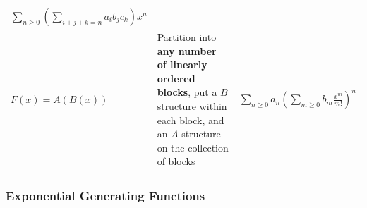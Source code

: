 \begin{longtable}[]{@{}lll@{}}
\begin{minipage}[t]{0.30\columnwidth}
\(\displaystyle\sum_{n\geq 0} \left( \displaystyle\sum_{i+j+k=n} a_i b_j c_k\right) {x^n}\)\strut
\end{minipage}\tabularnewline
\begin{minipage}[t]{0.30\columnwidth}\raggedright
\(F(x) = A(B(x))\)\strut
\end{minipage} & \begin{minipage}[t]{0.30\columnwidth}\raggedright
Partition into \textbf{any number of linearly ordered blocks}, put a
\(B\) structure within each block, and an \(A\) structure on the
collection of blocks\strut
\end{minipage} & \begin{minipage}[t]{0.30\columnwidth}\raggedright
\(\displaystyle\sum_{n\geq 0} a_n {\left( \displaystyle\sum_{m\geq 0} b_m \frac{x^m}{m!}\right)^n}\)\strut
\end{minipage}\tabularnewline
\bottomrule
\end{longtable}

\newpage

\hypertarget{exponential-generating-functions}{%
\subsubsection{Exponential Generating
Functions}\label{exponential-generating-functions}}

